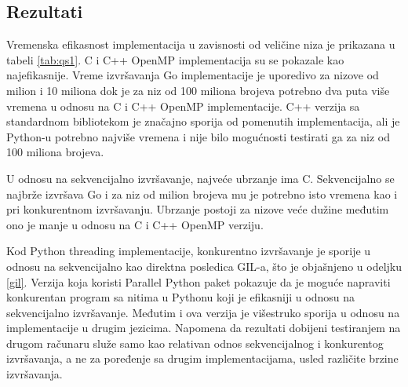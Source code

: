 \documentclass[12pt,oneside]{memoir}
\begin{document}
\subsection{Rezultati}\label{qs:rez}

Vremenska efikasnost implementacija u zavisnosti od veličine niza je prikazana u tabeli \ref{tab:qs1}.  C i C++ OpenMP implementacija su se pokazale kao najefikasnije. Vreme izvršavanja Go implementacije je uporedivo za nizove od milion i 10 miliona dok je za niz od 100 miliona brojeva potrebno dva puta više vremena u odnosu na C i C++ OpenMP implementacije. C++ verzija sa standardnom bibliotekom je značajno sporija od pomenutih implementacija, ali je Python-u potrebno najviše vremena i nije bilo mogućnosti testirati ga za niz od 100 miliona brojeva.

U odnosu na sekvencijalno izvršavanje, najveće ubrzanje ima C. Sekvencijalno se najbrže izvršava Go i za niz od milion brojeva mu je potrebno isto vremena kao i pri konkurentnom izvršavanju.  Ubrzanje postoji za nizove veće dužine međutim ono je manje u odnosu na C i C++ OpenMP verziju. 

Kod Python threading implementacije, konkurentno izvršavanje je sporije u odnosu na sekvencijalno kao direktna posledica GIL-a, što je objašnjeno u odeljku \ref{gil}. Verzija koja koristi Parallel Python paket pokazuje da je moguće napraviti konkurentan program sa nitima u Pythonu koji je efikasniji u odnosu na sekvencijalno izvršavanje. Međutim i ova verzija je višestruko sporija u odnosu na implementacije u drugim jezicima. Napomena da rezultati dobijeni testiranjem na drugom računaru služe samo kao relativan odnos sekvencijalnog i konkurentog izvršavanja, a ne za poređenje sa drugim implementacijama, usled različite brzine izvršavanja.
\end{document}
